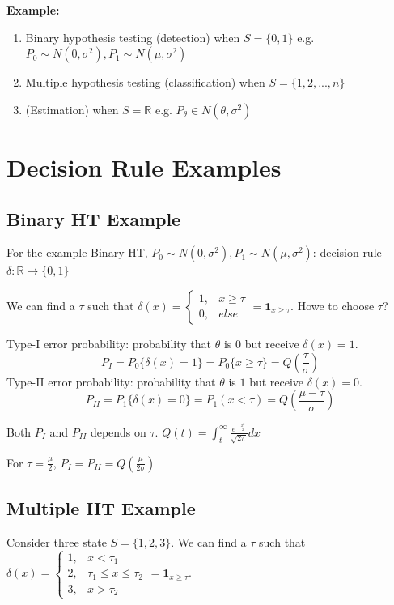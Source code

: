 \documentclass[11pt]{elegantbook}
\begin{document}
\textbf{Example:}
\begin{enumerate}[(1)]
    \item Binary hypothesis testing (detection) when $S=\{0,1\}$ e.g. $P_0\sim N(0,\sigma^2), P_1\sim N(\mu,\sigma^2)$
    \item Multiple hypothesis testing (classification) when $S=\{1,2,...,n\}$
    \item (Estimation) when $S=\mathbb{R}$ e.g. $P_\theta\in N(\theta,\sigma^2)$
\end{enumerate}

\section{Decision Rule Examples}
\subsection*{Binary HT Example}
For the example Binary HT, $P_0\sim N(0,\sigma^2), P_1\sim N(\mu,\sigma^2)$: decision rule $\delta: \mathbb{R} \rightarrow \{0,1\}$

We can find a $\tau$ such that $\delta(x)=\left\{\begin{matrix}
    1,&x\ge \tau\\
    0,& else
\end{matrix}\right.=\mathbf{1}_{x\geq \tau}$. Howe to choose $\tau$?

Type-I error probability: probability that $\theta$ is $0$ but receive $\delta(x)=1$. $$P_I=P_0\{\delta(x)=1\}=P_0\{x\geq \tau\}=Q\left(\frac{\tau}{\sigma}\right)$$
Type-II error probability: probability that $\theta$ is $1$ but receive $\delta(x)=0$. $$P_{II}=P_1\{\delta(x)=0\}=P_1(x<\tau)=Q(\frac{\mu-\tau}{\sigma})$$

Both $P_I$ and $P_{II}$ depends on $\tau$. $Q(t)=\int_t^\infty\frac{e^{-\frac{x^2}{2}}}{\sqrt{2\pi}}dx$

For $\tau=\frac{\mu}{2}$, $P_I=P_{II}=Q\left(\frac{\mu}{2\sigma}\right)$

\subsection*{Multiple HT Example}
Consider three state $S=\{1,2,3\}$.
We can find a $\tau$ such that $\delta(x)=\left\{\begin{matrix}
    1,&x< \tau_1\\
    2,& \tau_1\leq x\leq \tau_2\\
    3,& x>\tau_2
\end{matrix}\right.=\mathbf{1}_{x\geq \tau}$.
\end{document}
